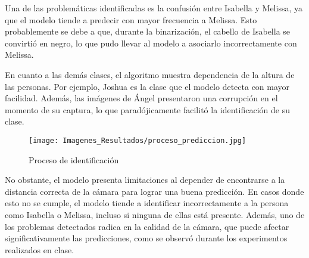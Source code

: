 \documentclass[12pt, letterpaper]{article}
\begin{document}
Una de las problemáticas identificadas es la confusión entre Isabella y Melissa, ya que el modelo tiende a predecir con mayor frecuencia a Melissa. Esto probablemente se debe a que, durante la binarización, el cabello de Isabella se convirtió en negro, lo que pudo llevar al modelo a asociarlo incorrectamente con Melissa.\par
En cuanto a las demás clases, el algoritmo muestra dependencia de la altura de las personas. Por ejemplo, Joshua es la clase que el modelo detecta con mayor facilidad. Además, las imágenes de Ángel presentaron una corrupción en el momento de su captura, lo que paradójicamente facilitó la identificación de su clase.

\begin{figure}[H]
    \centering
    \texttt{[image: Imagenes\_Resultados/proceso\_prediccion.jpg]} 
    \caption{Proceso de identificación}
    \label{fig:etiqueta}
\end{figure}


No obstante, el modelo presenta limitaciones al depender de encontrarse a la distancia correcta de la cámara para lograr una buena predicción. En casos donde esto no se cumple, el modelo tiende a identificar incorrectamente a la persona como Isabella o Melissa, incluso si ninguna de ellas está presente. Además, uno de los problemas detectados radica en la calidad de la cámara, que puede afectar significativamente las predicciones, como se observó durante los experimentos realizados en clase.\par
\end{document}
